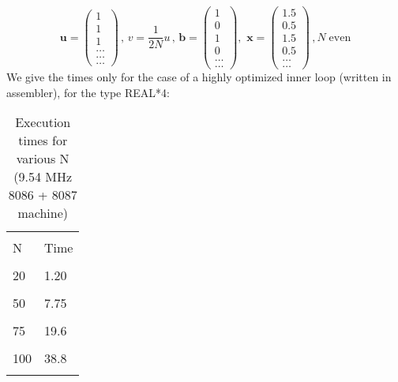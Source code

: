 \begin{equation*}
 \label{eq:09_25_}
    \mathbf{u}=
    \begin{pmatrix}
        1\\ 
        1\\ 
        1\\ 
        \dots\\ 
        \dots\\ 
        \dots
    \end{pmatrix}
    \, ,\, 
    v=\frac{1}{2N} u\, , \, 
    \mathbf{b} =
    \begin{pmatrix}
        1\\ 
        0\\ 
        1\\ 
        0\\ 
        \dots\\ 
        \dots
    \end{pmatrix}
    ,\, \,  
    \mathbf{x}=
    \begin{pmatrix}
        1.5\\ 
        0.5\\ 
        1.5\\ 
        0.5\\ 
        \dots\\ 
        \dots
    \end{pmatrix}
    \, , N \; \textrm{even}
\end{equation*}
We give the times only for the case of a highly optimized inner
loop (written in assembler), for the type REAL*4:

\begin{table}
    \centering
    \caption{Execution times for various N (9.54 MHz 8086 + 8087 machine)}
        \bigskip
    \label{tbl:09_01} 
    \setlength{\tabcolsep}{40pt}
        \begin{tabular}{|ll|}
            \hline & \\
            N   &  Time\\
            & \\
            20  &  1.20\\
            & \\
            50  &  7.75\\
            & \\
            75  &  19.6\\
            & \\
            100 &  38.8\\
            & \\
            \hline
        \end{tabular}
\end{table}


